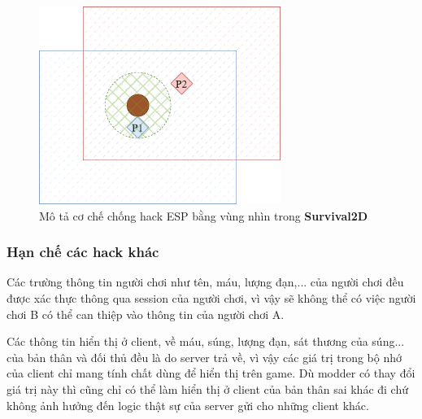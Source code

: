 \documentclass[12pt,a4paper]{article}
\begin{document}
  \begin{figure}[H]
    \centering
    \includegraphics[width=0.7\textwidth]{Img/anticheat/PlayerView.png}
    \caption{Mô tả cơ chế chống hack ESP bằng vùng nhìn trong \textbf{Survival2D}}
    \label{antihackesp}
  \end{figure}
  
  \subsubsection{Hạn chế các hack khác}
  Các trường thông tin người chơi như tên, máu, lượng đạn,... của người chơi đều được xác thực thông qua session của người chơi, vì vậy sẽ không thể có việc người chơi B có thể can thiệp vào thông tin của người chơi A.
  
  Các thông tin hiển thị ở client, về máu, súng, lượng đạn, sát thương của súng... của bản thân và đối thủ đều là do server trả về, vì vậy các giá trị trong bộ nhớ của client chỉ mang tính chất dùng để hiển thị trên game. Dù modder có thay đổi giá trị này thì cũng chỉ có thể làm hiển thị ở client của bản thân sai khác đi chứ không ảnh hưởng đến logic thật sự của server gửi cho những client khác.
  
  \newpage
\end{document}
